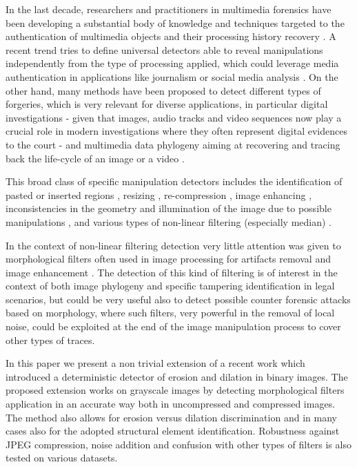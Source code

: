 \documentclass[review]{elsarticle}
\begin{document}
In the last decade, researchers and practitioners in multimedia forensics have been developing a substantial body of knowledge and techniques targeted to the authentication of multimedia objects and their processing history recovery \cite{stamm_overview, farid_book, ho, piva_overview, sencar_book}. 
A recent trend tries to define universal detectors able to reveal manipulations independently from the type of processing applied, which could leverage media authentication in applications like journalism or social media analysis \cite{noiseprint}. 
On the other hand, many methods have been proposed to detect different types of forgeries, which is very relevant for diverse applications, in particular digital investigations - given that images, audio tracks and video sequences now play a crucial role in modern investigations where they often represent digital evidences to the court \cite{forlab} - and multimedia data phylogeny aiming at recovering and tracing back the life-cycle of an image or a video \cite{Bestagini2016, Dias2012, Oliveira2016, Costa2014}.

This broad class of specific manipulation detectors includes the identification of pasted or inserted regions \cite{cm2, cm3, cm4, spl2, spl3}, resizing \cite{fernando2017, PB-TIFS-2019}, re-compression \cite{PBPG2017-TIFS},  image enhancing \cite{shan2019robust}, inconsistencies in the geometry and illumination of the image due to possible manipulations \cite{geom1, geom2, phys1}, and various types of non-linear filtering (especially median) \cite{Bahrami2015, Cao2014, Cao2011, Fridrich2010, Tian2010, Yuan:2011, Liu2013, Huang2013, Shi2014, Wang2015, Pasquini2016-TIFS, gao2019robust}. 

In the context of non-linear filtering detection 
very little attention was given to morphological filters \cite{haas1967morphologie} often used in image processing for artifacts removal and image enhancement \cite{British2012} \cite{Maragos2004}. The detection of this kind of filtering is of interest in the context of both image phylogeny and specific tampering identification in legal scenarios, but could be very useful also to detect possible counter forensic attacks based on morphology, where such filters, very powerful in the removal of local noise, could be exploited at the end of the image manipulation process to cover other types of traces. 

In this paper we present a non trivial extension of a recent work \cite{de2017detecting} which introduced a deterministic detector of erosion and dilation in binary images. The proposed extension works on grayscale images by detecting morphological filters application in an accurate way both in uncompressed and compressed images. The method also allows for erosion versus dilation discrimination and in many cases also for the adopted structural element identification. 
Robustness against JPEG compression, noise addition and confusion with other types of filters is also tested on various datasets. 
\end{document}
